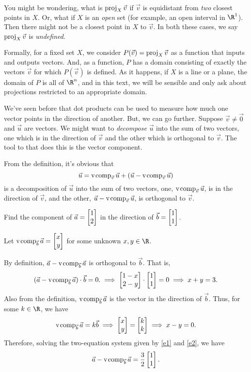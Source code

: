 You might be wondering, what is $\operatorname{proj}_X\vec v$ if $\vec v$ is equidistant from \emph{two}
closest points in $X$. Or, what if $X$ is an \emph{open} set (for example, an open interval in $\R^1$).
Then there might not be a closest point in $X$ to $\vec v$. In both these cases, we say $\operatorname{proj}_X\vec v$
is \emph{undefined}.

Formally, for a fixed set $X$, we consider $P(\vec v)=\operatorname{proj}_X\vec v$ as a function that inputs and outputs
vectors. And, as a function, $P$ has a domain consisting of exactly the vectors $\vec v$ for which $P(\vec v)$
is defined. As it happens, if $X$ is a line or a plane, the domain of $P$ is all of $\R^n$, and in this text,
we will be sensible and only ask about projections restricted to an appropriate domain. 


We've seen before that dot products can be used to measure how much one
vector points in the direction of another. But, we can go further. Suppose 
$\vec v\neq \vec 0$ and $\vec u$ are vectors. We might want to \emph{decompose}
$\vec u$ into the sum of two vectors, one which is in the direction of $\vec v$
and the other which is orthogonal to $\vec v$. The tool to that does this is the vector component.


From the definition, it's obvious that
\[
	\vec u=\operatorname{v\hspace{1pt}comp}_{\vec v}\vec u + (\vec u-\operatorname{v\hspace{1pt}comp}_{\vec v}\vec u)
\]
is a decomposition of $\vec u$ into the sum of two vectors, one, $\operatorname{v\hspace{1pt}comp}_{\vec v}\vec u$, is in the direction of $\vec v$,
and the other, $\vec u-\operatorname{v\hspace{1pt}comp}_{\vec v}\vec u$, is orthogonal to $\vec v$.

\begin{example}
	Find the component of $\vec a=\mat{1\\2}$ in the direction of $\vec b=\mat{1\\1}$.

    Let $\Vcomp_{\vec b}\vec a=\mat{x\\y}$ for some unknown $x,y\in\R$. 
    
    By definition, $\vec a - \operatorname{v\hspace{1pt}comp}_{\vec b}\vec a$ is orthogonal to $\vec b$. That is,
    \begin{equation}
    \label{e1}
        (\vec a-\Vcomp_{\vec b}\vec a)\cdot\vec b=0. \implies \mat{1-x\\2-y}\cdot\mat{1\\1} = 0 \implies x+y=3.
    \end{equation}
    Also from the definition, $\operatorname{v\hspace{1pt}comp}_{\vec b}\vec a$ is the vector in the direction of $\vec b$. Thus, for some $k\in\R$, we have
    \begin{equation}
    \label{e2}
        \Vcomp_{\vec b}\vec a = k\vec b \implies\mat{x\\y}=\mat{k\\k}\implies x-y=0.
    \end{equation}
    Therefore, solving the two-equation system given by \eqref{e1} and \eqref{e2}, we have
    \[
        \vec a-\Vcomp_{\vec b}\vec a=\frac{3}{2}\mat{1\\1}.
    \]
\end{example}

